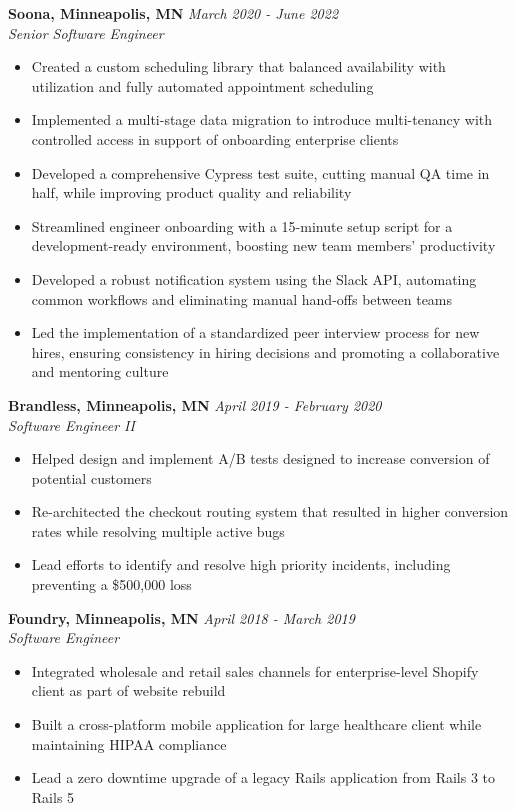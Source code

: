 \documentclass{res}
\begin{document}
\begin{resume}
		{\bf Soona, Minneapolis, MN} \hfill \emph{March 2020 - June 2022} \\
			\emph{Senior Software Engineer}

			\begin{itemize} \itemsep -2pt
        \item Created a custom scheduling library that balanced availability with utilization and fully automated appointment scheduling
        \item Implemented a multi-stage data migration to introduce multi-tenancy with controlled access in support of onboarding enterprise clients
        \item Developed a comprehensive Cypress test suite, cutting manual QA time in half, while improving product quality and reliability
        \item Streamlined engineer onboarding with a 15-minute setup script for a development-ready environment, boosting new team members' productivity
        \item Developed a robust notification system using the Slack API, automating common workflows and eliminating manual hand-offs between teams
        \item Led the implementation of a standardized peer interview process for new hires, ensuring consistency in hiring decisions and promoting a collaborative and mentoring culture
			\end{itemize}

		{\bf Brandless, Minneapolis, MN} \hfill \emph{April 2019 - February 2020} \\
			\emph{Software Engineer II}

			\begin{itemize} \itemsep -2pt
				\item Helped design and implement A/B tests designed to increase conversion of potential customers
        \item Re-architected the checkout routing system that resulted in higher conversion rates while resolving multiple active bugs
        \item Lead efforts to identify and resolve high priority incidents, including preventing a \$500,000 loss
			\end{itemize}

		{\bf Foundry, Minneapolis, MN} \hfill \emph{April 2018 - March 2019} \\
			\emph{Software Engineer}

			\begin{itemize} \itemsep -2pt
				\item Integrated wholesale and retail sales channels for enterprise-level Shopify client as part of website rebuild
				\item Built a cross-platform mobile application for large healthcare client while maintaining HIPAA compliance
				\item Lead a zero downtime upgrade of a legacy Rails application from Rails 3 to Rails 5
			\end{itemize}


\end{resume}
\end{document}

